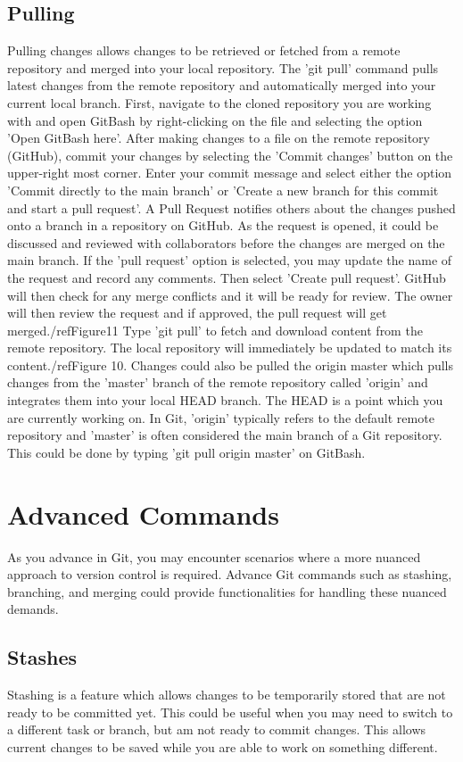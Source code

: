 \documentclass[10pt,twocolumn]{article}
\begin{document}
\subsection{Pulling}
Pulling changes allows changes to be retrieved or fetched from a remote repository and merged into your local repository. The 'git pull' command pulls latest changes from the remote repository and automatically merged into your current local branch. First, navigate to the cloned repository you are working with and open GitBash by right-clicking on the file and selecting the option 'Open GitBash here'. After making changes to a file on the remote repository (GitHub), commit your changes by selecting the 'Commit changes' button on the upper-right most corner. Enter your commit message and select either the option 'Commit directly to the main branch' or 'Create a new branch for this commit and start a pull request'. A Pull Request notifies others about the changes pushed onto a branch in a repository on GitHub. As the request is opened, it could be discussed and reviewed with collaborators before the changes are merged on the main branch. If the 'pull request' option is selected, you may update the name of the request and record any comments. Then select 'Create pull request'. GitHub will then check for any merge conflicts and it will be ready for review. The owner will then review the request and if approved, the pull request will get merged./ref{Figure11}  Type 'git pull' to fetch and download content from the remote repository. The local repository will immediately be updated to match its content./ref{Figure 10}.  Changes could also be pulled the origin master which pulls changes from the 'master' branch of the remote repository called 'origin' and integrates them into your local HEAD branch. The HEAD is a point which you are currently working on. In Git, 'origin' typically refers to the default remote repository and 'master' is often considered the main branch of a Git repository. This could be done by typing 'git pull origin master' on GitBash.  


\section{Advanced Commands}
As you advance in Git, you may encounter scenarios where a more nuanced approach to version control is required. Advance Git commands such as stashing, branching, and merging could provide functionalities for handling these nuanced demands.  

\subsection {Stashes}
Stashing is a feature which allows changes to be temporarily stored that are not ready to be committed yet. This could be useful when you may need to switch to a different task or branch, but am not ready to commit changes. This allows current changes to be saved while you are able to work on something different. 
\end{document}
